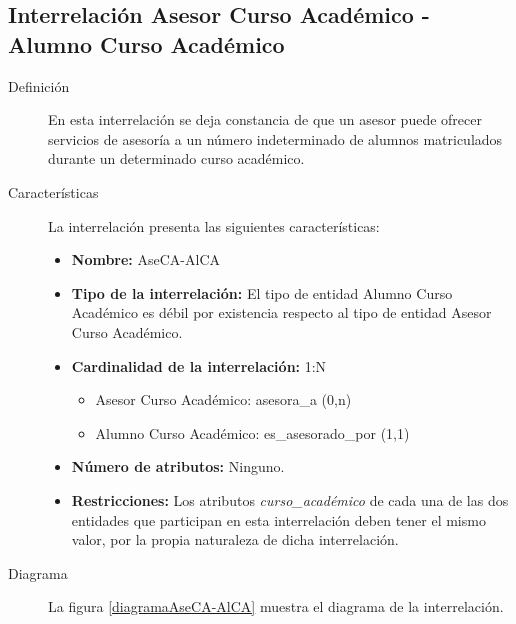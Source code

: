 \subsection{Interrelación Asesor Curso Académico - Alumno Curso Académico}

   \begin{description}
      \item[Definición] En esta interrelación se deja constancia de que un
      asesor puede ofrecer servicios de asesoría a un número indeterminado de
      alumnos matriculados durante un determinado curso académico.

      \item[Características] La interrelación presenta las siguientes
                             características:

         \begin{itemize}
            \item \textbf{Nombre:} AseCA-AlCA
            \item \textbf{Tipo de la interrelación:} El tipo de entidad
                  Alumno Curso Académico es débil por existencia respecto al
                  tipo de entidad Asesor Curso Académico.
            \item \textbf{Cardinalidad de la interrelación:} 1:N
                  \begin{itemize}
                     \item Asesor Curso Académico: asesora\_a (0,n)
                     \item Alumno Curso Académico: es\_asesorado\_por (1,1)
                  \end{itemize}
            \item \textbf{Número de atributos:} Ninguno.
            \item \textbf{Restricciones:} Los atributos
                   \textit{curso\_académico} de cada una de las dos entidades
                   que participan en esta interrelación deben tener el mismo
                   valor, por la propia naturaleza de dicha interrelación.
         \end{itemize}

      \item[Diagrama] La figura \ref{diagramaAseCA-AlCA} muestra el diagrama de
                      la interrelación.


\end{description}
